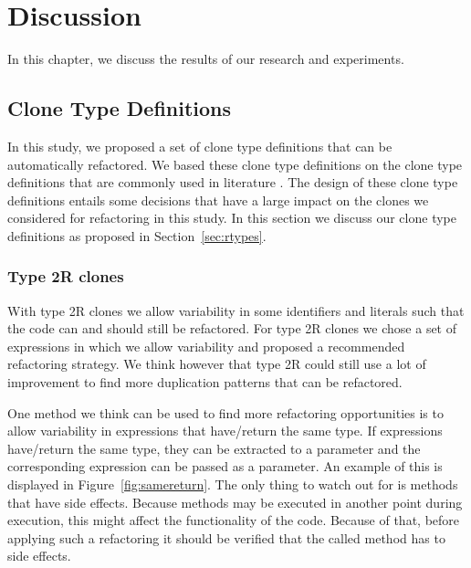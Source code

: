 \chapter{Discussion} \label{ch:discussion}

In this chapter, we discuss the results of our research and experiments.

\section{Clone Type Definitions}
In this study, we proposed a set of clone type definitions that can be automatically refactored. We based these clone type definitions on the clone type definitions that are commonly used in literature \cite{roy2007survey}. The design of these clone type definitions entails some decisions that have a large impact on the clones we considered for refactoring in this study. In this section we discuss our clone type definitions as proposed in Section~\ref{sec:rtypes}.

\subsection{Type 2R clones}
With type 2R clones we allow variability in some identifiers and literals such that the code can and should still be refactored. For type 2R clones we chose a set of expressions in which we allow variability and proposed a recommended refactoring strategy. We think however that type 2R could still use a lot of improvement to find more duplication patterns that can be refactored.

One method we think can be used to find more refactoring opportunities is to allow variability in expressions that have/return the same type. If expressions have/return the same type, they can be extracted to a parameter and the corresponding expression can be passed as a parameter. An example of this is displayed in Figure~\ref{fig:samereturn}. The only thing to watch out for is methods that have side effects. Because methods may be executed in another point during execution, this might affect the functionality of the code. Because of that, before applying such a refactoring it should be verified that the called method has to side effects.

